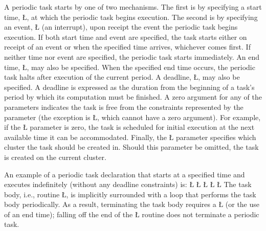 \documentclass[openright,twoside]{report}
\begin{document}
A periodic task starts by one of two mechanisms.
The first is by specifying a start time, \LGinlinetrue\LGbegin\lgrinde\L{}\endlgrinde\LGend{}, at which the periodic task begins execution.
The second is by specifying an event, \LGinlinetrue\LGbegin\lgrinde\L{}\endlgrinde\LGend{} (an interrupt), upon receipt the event the periodic task begins execution.
If both start time and event are specified, the task starts either on receipt of an event or when the specified time arrives, whichever comes first.
If neither time nor event are specified, the periodic task starts immediately.
An end time, \LGinlinetrue\LGbegin\lgrinde\L{}\endlgrinde\LGend{}, may also be specified.
When the specified end time occurs, the periodic task halts after execution of the current period.
A deadline, \LGinlinetrue\LGbegin\lgrinde\L{}\endlgrinde\LGend{}, may also be specified.
A deadline is expressed as the duration from the beginning of a task's period by which its computation must be finished.
A zero argument for any of the parameters indicates the task is free from the constraints represented by the parameter (the exception is \LGinlinetrue\LGbegin\lgrinde\L{}\endlgrinde\LGend{}, which cannot have a zero argument).
For example, if the \LGinlinetrue\LGbegin\lgrinde\L{}\endlgrinde\LGend{} parameter is zero, the task is scheduled for initial execution at the next available time it can be accommodated.
Finally, the \LGinlinetrue\LGbegin\lgrinde\L{}\endlgrinde\LGend{} parameter specifies which cluster the task should be created in.
Should this parameter be omitted, the task is created on the current cluster.

An example of a periodic task declaration that starts at a specified time and executes indefinitely (without any deadline constraints) is:
\LGinlinefalse\LGbegin\lgrinde
\L{}
\L{\LB{}}
\L{}
\L{\LB{}}
\L{\LB{\};}}
\endlgrinde\LGend
The task body, i.e., routine \LGinlinetrue\LGbegin\lgrinde\L{}\endlgrinde\LGend{}, is implicitly surrounded with a loop that performs the task body periodically.
As a result, terminating the task body requires a \LGinlinetrue\LGbegin\lgrinde\L{}\endlgrinde\LGend{} (or the use of an end time);
falling off the end of the \LGinlinetrue\LGbegin\lgrinde\L{}\endlgrinde\LGend{} routine does not terminate a periodic task.
\end{document}
